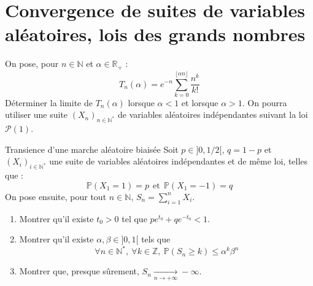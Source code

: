 \documentclass[french,a4paper]{article}
\renewcommand{\P}{\mathbb{P}}
\newcommand{\N}{\mathbb{N}}
\newcommand{\Z}{\mathbb{Z}}
\newcommand{\R}{\mathbb{R}}
\newcommand{\st}{^*}
\theoremstyle{plain}
\theoremstyle{definition}
\theoremstyle{remark}
\begin{document}
\section{Convergence de suites de variables aléatoires, lois des grands nombres}

\begin{ex}[Moulin.73]{}
	On pose, pour $n\in\N$ et $\alpha\in\R_+$ : $$T_n(\alpha)=e^{-n}\sum_{k=0}^{\lfloor\alpha n\rfloor}\frac{n^k}{k!}$$ Déterminer la limite de $T_n(\alpha)$ lorsque $\alpha<1$ et lorsque $\alpha>1$. On pourra utiliser une suite $(X_n)_{n\in\N\st}$ de variables aléatoires indépendantes suivant la loi $\mathcal{P}(1)$.
\end{ex}

\begin{ex}[Moulin.74]{Transience d'une  marche aléatoire biaisée}
	Soit $p\in]0,1/2[$, $q=1-p$ et $(X_i)_{i\in\N\st}$ une suite de variables aléatoires indépendantes et de même loi, telles que : $$\P(X_1=1)=p\ \ \text{et}\ \ \P(X_1=-1)=q$$ On pose ensuite, pour tout $n\in\N$, $S_n=\displaystyle\sum_{i=1}^{n}X_i$.
	\begin{enumerate}
		\item Montrer qu'il existe $t_0>0$ tel que $pe^{t_0}+qe^{-t_0}<1$.
		\item Montrer qu'il existe $\alpha,\beta\in]0,1[$ tels que $$\forall n\in\N\st,\ \forall k\in\Z,\ \P(S_n\geqslant k)\leqslant\alpha^k\beta^n$$
		\item Montrer que, presque sûrement, $S_n\xrightarrow[n\to+\infty]{}-\infty$.
	\end{enumerate}
\end{ex}
\end{document}
